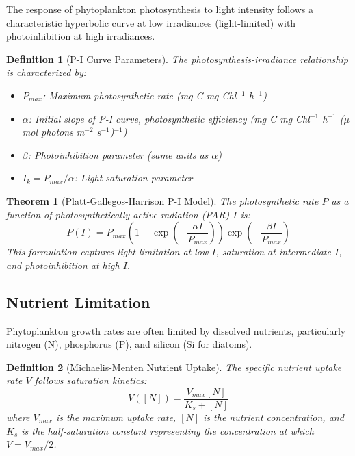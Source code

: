 \documentclass[a4paper, 11pt]{article}
\newtheorem{definition}{Definition}[section]
\newtheorem{theorem}{Theorem}[section]
\begin{document}
The response of phytoplankton photosynthesis to light intensity follows a characteristic hyperbolic
curve at low irradiances (light-limited) with photoinhibition at high irradiances.

\begin{definition}[P-I Curve Parameters]
The photosynthesis-irradiance relationship is characterized by:
\begin{itemize}
\item $P_{max}$: Maximum photosynthetic rate (mg C mg Chl$^{-1}$ h$^{-1}$)
\item $\alpha$: Initial slope of P-I curve, photosynthetic efficiency (mg C mg Chl$^{-1}$ h$^{-1}$ ($\mu$mol photons m$^{-2}$ s$^{-1}$)$^{-1}$)
\item $\beta$: Photoinhibition parameter (same units as $\alpha$)
\item $I_k = P_{max}/\alpha$: Light saturation parameter
\end{itemize}
\end{definition}

\begin{theorem}[Platt-Gallegos-Harrison P-I Model]
The photosynthetic rate $P$ as a function of photosynthetically active radiation (PAR) $I$ is:
\begin{equation}
P(I) = P_{max} \left(1 - \exp\left(-\frac{\alpha I}{P_{max}}\right)\right) \exp\left(-\frac{\beta I}{P_{max}}\right)
\end{equation}
This formulation captures light limitation at low $I$, saturation at intermediate $I$, and
photoinhibition at high $I$.
\end{theorem}

\subsection{Nutrient Limitation}

Phytoplankton growth rates are often limited by dissolved nutrients, particularly nitrogen (N),
phosphorus (P), and silicon (Si for diatoms).

\begin{definition}[Michaelis-Menten Nutrient Uptake]
The specific nutrient uptake rate $V$ follows saturation kinetics:
\begin{equation}
V([N]) = \frac{V_{max}[N]}{K_s + [N]}
\end{equation}
where $V_{max}$ is the maximum uptake rate, $[N]$ is the nutrient concentration, and $K_s$
is the half-saturation constant representing the concentration at which $V = V_{max}/2$.
\end{definition}
\end{document}
